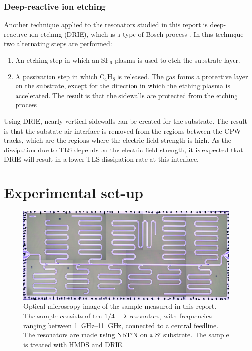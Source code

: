 \documentclass[12pt]{report}
\newcommand*\chem[1]{\ensuremath{\mathrm{#1}}}
\begin{document}
\subsubsection{Deep-reactive ion etching}

Another technique applied to the resonators studied in this report is deep-reactive ion etching (DRIE), which is a type of Bosch process \cite{DRIE}. In this technique two alternating steps are performed:

\begin{enumerate}
    \item An etching step in which an $\chem{SF_6}$ plasma is used to etch the substrate layer.
    \item A passivation step in which $\chem{C_4H_8}$ is released. The gas forms a protective layer on the substrate, except for the direction in which the etching plasma is accelerated. The result is that the sidewalls are protected from the etching process
\end{enumerate}

Using DRIE, nearly vertical sidewalls can be created for the substrate. The result is that the substate-air interface is removed from the regions between the CPW tracks, which are the regions where the electric field strength is high. As the dissipation due to TLS depends on the electric field strength, it is expected that DRIE will result in a lower TLS dissipation rate at this interface.



\section{Experimental set-up}


\begin{figure}
    \begin{center}
        \includegraphics[width = .4\textwidth]{Figures/All_set4.png}
    \end{center}
    \caption{Optical microscopy image of the sample measured in this report. The sample consists of ten $1/4 - \lambda$ resonators, with frequencies ranging between \SIrange{1}{11}{\giga \hertz}, connected to a central feedline. The resonators are made using NbTiN on a Si substrate. The sample is treated with HMDS and DRIE.}
    \label{fig:set4}
\end{figure}
\end{document}
